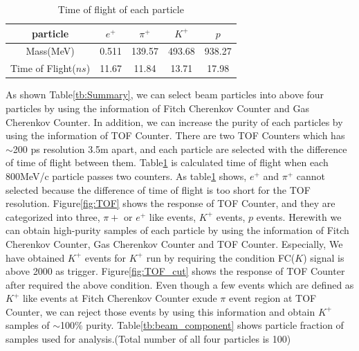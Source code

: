 \begin{table}
  \centering
  \caption{Time of flight of each particle}
  \begin{tabular}[htb]{c|cccc}\hline
    particle & $e^{+}$ & $\pi^{+}$ & $K^{+}$ & $p$ \\ \hline
    Mass(MeV) & 0.511 & 139.57 & 493.68 & 938.27 \\
    Time of Flight($ns$) & 11.67 & 11.84 & 13.71 & 17.98 \\ \hline
  \end{tabular}
  \label{tb:TOF_expect}
\end{table}

As shown Table\ref{tb:Summary}, we can select beam particles into above four particles by using the information of Fitch Cherenkov Counter and Gas Cherenkov Counter.
In addition, we can increase the purity of each particles by using the information of TOF Counter.
There are two TOF Counters which has $\sim$200 ps resolution 3.5m apart, 
and each particle are selected with the difference of time of flight between them.
Table\ref{tb:TOF_expect} is calculated time of flight when each 800MeV/c particle passes two counters.
As table\ref{tb:TOF_expect} shows, $e^{+}$ and $\pi^{+}$ cannot selected because the difference of time of flight is too short for the TOF resolution.
Figure\ref{fig:TOF} shows the response of TOF Counter, and they are categorized into three, $\pi{+}$ or $e^{+}$ like events, $K^{+}$ events, $p$ events.
Herewith we can obtain high-purity samples of each particle by using the information of Fitch Cherenkov Counter, Gas Cherenkov Counter and TOF Counter.
Especially, We have obtained $K^{+}$ events for $K^{+}$ run by requiring the condition FC($K$) signal is above 2000 as trigger.
Figure\ref{fig:TOF_cut} shows the response of TOF Counter after required the above condition.
Even though a few events which are defined as $K^{+}$ like events at Fitch Cherenkov Counter exude $\pi$ event region at TOF Counter,
we can reject those events by using this information and obtain $K^{+}$ samples of $\sim$100$\%$ purity.
Table\ref{tb:beam_component} shows particle fraction of samples used for analysis.(Total number of all four particles is 100)\\

